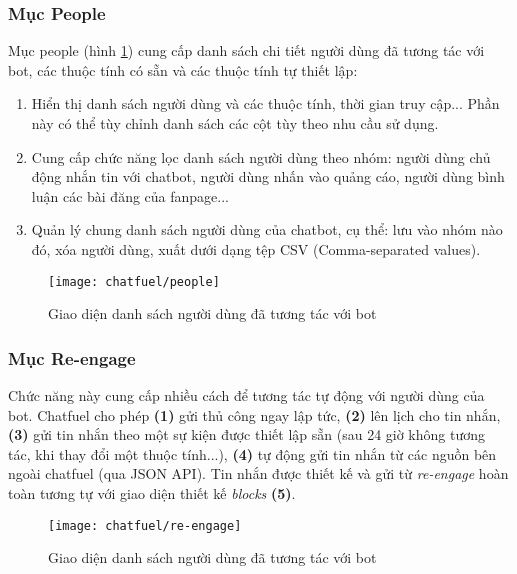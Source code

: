 \subsubsection{Mục People}
Mục people (hình \ref{fig:fig-s3-4-chatfuel-people}) cung cấp danh sách chi tiết người dùng đã tương tác với bot, các thuộc tính có sẵn và các thuộc tính tự thiết lập:
\begin{enumerate}[label=\textbf{(\arabic*)},align=left,left=0cm..0cm,itemindent=*]
	\item Hiển thị danh sách người dùng và các thuộc tính, thời gian truy cập... Phần này có thể tùy chỉnh danh sách các cột tùy theo nhu cầu sử dụng.
	\item Cung cấp chức năng lọc danh sách người dùng theo nhóm: người dùng chủ động nhắn tin với chatbot, người dùng nhấn vào quảng cáo, người dùng bình luận các bài đăng của fanpage...
	\item Quản lý chung danh sách người dùng của chatbot, cụ thể: lưu vào nhóm nào đó, xóa người dùng, xuất dưới dạng tệp CSV (Comma-separated values).
\end{enumerate}\par

\begin{figure}[htb!]\centering
	\texttt{[image: chatfuel/people]}
	\caption{Giao diện danh sách người dùng đã tương tác với bot}
	\label{fig:fig-s3-4-chatfuel-people}
\end{figure}\par

\subsubsection{Mục Re-engage}
Chức năng này cung cấp nhiều cách để tương tác tự động với người dùng của bot. Chatfuel cho phép \textbf{(1)} gửi thủ công ngay lập tức, \textbf{(2)} lên lịch cho tin nhắn, \textbf{(3)} gửi tin nhắn theo một sự kiện được thiết lập sẵn (sau 24 giờ không tương tác, khi thay đổi một thuộc tính...), \textbf{(4)} tự động gửi tin nhắn từ các nguồn bên ngoài chatfuel (qua JSON API). Tin nhắn được thiết kế và gửi từ \textit{re-engage} hoàn toàn tương tự với giao diện thiết kế \textit{blocks} \textbf{(5)}.\par

\begin{figure}[htb!]\centering
	\texttt{[image: chatfuel/re-engage]}
	\caption{Giao diện danh sách người dùng đã tương tác với bot}
	\label{fig:fig-s3-5-chatfuel-re-engage}
\end{figure}\par

